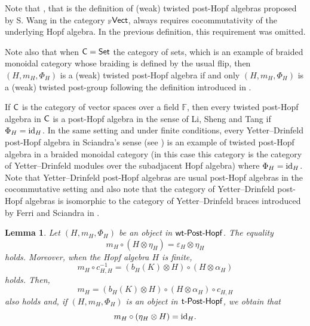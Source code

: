 \documentclass[pdftex]{sigma}
\numberwithin{equation}{section}
\newtheorem{Lemma}[Theorem]{Lemma}
 { \theoremstyle{definition}
\newtheorem{Definition}[Theorem]{Definition}
\newtheorem{Example}[Theorem]{Example}
\newtheorem{Remark}[Theorem]{Remark} }
\begin{document}
\begin{Remark}
Note that \cite[Definition 6.3]{Wang}, that is the definition of (weak) twisted post-Hopf algebras proposed by S. Wang in the category ${}_{\mathbb{F}}\sf{Vect}$, always requires cocommutativity of the underlying Hopf algebra. In the previous definition, this requirement was omitted.

Note also that when ${\sf C}={\sf Set}$ the category of sets, which is an example of braided monoidal category whose braiding is defined by the usual flip, then $(H,m_{H},\Phi_{H})$ is a (weak) twisted post-Hopf algebra if and only $(H,m_{H},\Phi_{H})$ is a (weak) twisted post-group following the definition introduced in \cite[Definition 2.1]{Wang}.
\end{Remark}
\begin{Example}\label{ExampleTwPHA}
If ${\sf C}$ is the category of vector spaces over a field ${\mathbb F}$, then every twisted post-Hopf algebra in ${\sf C}$ is a post-Hopf algebra in the sense of Li, Sheng and Tang if $\Phi_{H}={\rm id}_{H}$. In the same setting and under finite conditions, every Yetter--Drinfeld post-Hopf algebra in Sciandra's sense (see \cite{SCI}) is an example of twisted post-Hopf algebra in a braided monoidal category (in this case this category is the category of Yetter--Drinfeld modules over the subadjacent Hopf algebra) where $\Phi_{H}={\rm id}_{H}$. Note that Yetter--Drinfeld post-Hopf algebras are usual post-Hopf algebras in the cocommutative setting and also note that the category of Yetter--Drinfeld post-Hopf algebras is isomorphic to the category of Yetter--Drinfeld braces introduced by Ferri and Sciandra in \cite{FSCI}.
\end{Example}
\begin{Lemma}
Let $(H,m_{H},\Phi_{H})$ be an object in ${\sf wt}\textnormal{-}\sf{Post}\textnormal{-}\sf{Hopf}$. The equality
\begin{equation}\label{mHprop1}
m_{H}\circ(H\otimes\eta_{H})=\varepsilon_{H}\otimes\eta_{H}
\end{equation}
holds. Moreover, when the Hopf algebra $H$ is finite,
\begin{equation}\label{lem1prop1}
m_{H}\circ c_{H,H}^{-1}=( b_{H}(K)\otimes H)\circ(H\otimes\alpha_{H})
\end{equation}
holds. Then,
\begin{equation}\label{lem1prop2}
m_{H}=( b_{H}(K)\otimes H)\circ(H\otimes\alpha_{H})\circ c_{H,H}
\end{equation}
also holds and, if $(H,m_{H},\Phi_{H})$ is an object in ${\sf t}\textnormal{-}\sf{Post}\textnormal{-}\sf{Hopf}$, we obtain that
\begin{equation}\label{mHprop2}
m_{H}\circ(\eta_{H}\otimes H)={\rm id}_{H}.
\end{equation}
\end{Lemma}
\end{document}
